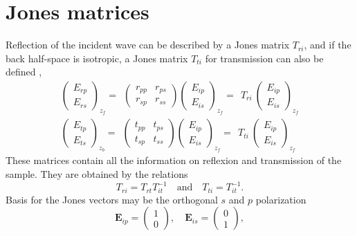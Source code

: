 \section{Jones matrices}

Reflection of the incident wave can be described by a Jones matrix $T_{ri}$, and if the back half-space is isotropic, a Jones matrix $T_{ti}$ for transmission can also be defined \cite{Jones, Fujiwara},
\begin{align*}
\begin{pmatrix}
E_{rp} \\ E_{rs}
\end{pmatrix}_{z_f} \!\! = \ \ 
\begin{pmatrix}
r_{pp} & r_{ps} \\
r_{sp} & r_{ss} 
\end{pmatrix}
\begin{pmatrix}
E_{ip} \\ E_{is}
\end{pmatrix}_{z_f} \!\! = \ \ T_{ri} \ 
\begin{pmatrix}
E_{ip} \\ E_{is}
\end{pmatrix}_{z_f}
\\[3pt]
\begin{pmatrix}
E_{tp} \\ E_{ts}
\end{pmatrix}_{z_b} \!\! = \ \ 
\begin{pmatrix}
t_{pp} & t_{ps} \\
t_{sp} & t_{ss} 
\end{pmatrix}
\begin{pmatrix}
E_{ip} \\ E_{is}
\end{pmatrix}_{z_f} \!\! = \ \ T_{ti} \ 
\begin{pmatrix}
E_{ip} \\ E_{is}
\end{pmatrix}_{z_f}
\end{align*}
These matrices contain all the information on reflexion and transmission of the sample. 
They are obtained by the relations 
$$
T_{ri} = T_{rt} T_{it}^{-1} 
\quad\mathrm{and}\quad 
T_{ti} = T_{it}^{-1}.
$$
%
Basis for the Jones vectors may be the orthogonal $s$ and $p$ polarization 
$$
\mathbf{E}_{ip} = \begin{pmatrix} 1 \\ 0 \end{pmatrix},
\quad
\mathbf{E}_{is} = \begin{pmatrix} 0 \\ 1 \end{pmatrix},
$$
